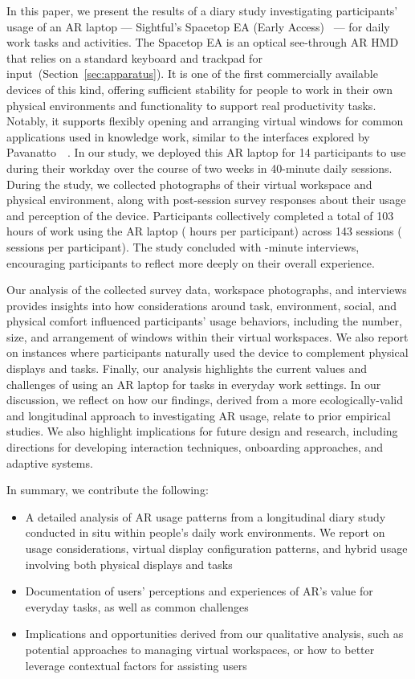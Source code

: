 In this paper, we present the results of a diary study investigating participants' usage of an AR laptop --- Sightful's Spacetop EA (Early Access)~\cite{spacetopea} --- for daily work tasks and activities.
The Spacetop EA is an optical see-through AR HMD that relies on a standard keyboard and trackpad for input~(Section~\ref{sec:apparatus}).
It is one of the first commercially available devices of this kind, offering sufficient stability for people to work in their own physical environments and functionality to support real productivity tasks. Notably, it supports flexibly opening and arranging virtual windows for common applications used in knowledge work, similar to the interfaces explored by Pavanatto~\etal~\cite{pavanatto2024multiplemonitors}.
In our study, we deployed this AR laptop for 14 participants to use during their workday over the course of two weeks in 40-minute daily sessions.
During the study, we collected photographs of their virtual workspace and physical environment, along with post-session survey responses about their usage and perception of the device.
Participants collectively completed a total of 103 hours of work using the AR laptop ( hours per participant) across 143 sessions ( sessions per participant).
The study concluded with -minute interviews, encouraging participants to reflect more deeply on their overall experience.

Our analysis of the collected survey data, workspace photographs, and interviews provides insights into how considerations around task, environment, social, and physical comfort influenced participants' usage behaviors, including the number, size, and arrangement of windows within their virtual workspaces.
We also report on instances where participants naturally used the device to complement physical displays and tasks. 
Finally, our analysis highlights the current values and challenges of using an AR laptop for tasks in everyday work settings. 
In our discussion, we reflect on how our findings, derived from a more ecologically-valid and longitudinal approach to investigating AR usage, relate to prior empirical studies.
We also highlight implications for future design and research, including directions for developing interaction techniques, onboarding approaches, and adaptive systems. 

In summary, we contribute the following:
\begin{itemize}
    \item A detailed analysis of AR usage patterns from a longitudinal diary study conducted in situ within people's daily work environments.
    We report on usage considerations, virtual display configuration patterns, and hybrid usage involving both physical displays and tasks
    \item Documentation of users' perceptions and experiences of AR's value for everyday tasks, as well as common challenges
    \item Implications and opportunities derived from our qualitative analysis, such as potential approaches to managing virtual workspaces, or how to better leverage contextual factors for assisting users 
\end{itemize}

